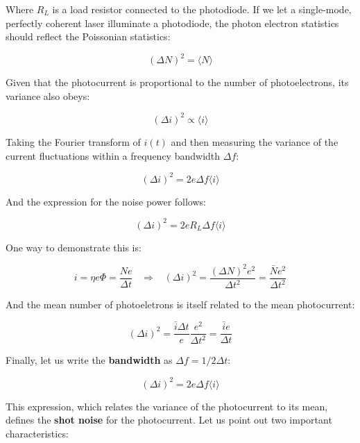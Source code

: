 \documentclass[12pt,a4paper]{report}
\begin{document}
Where $R_L$ is a load resistor connected to the photodiode. If we let a single-mode, perfectly coherent laser illuminate a photodiode, the photon electron statistics should reflect the Poissonian statistics:

\begin{equation}
    (\Delta N)^2=\langle N \rangle
\end{equation}

Given that the photocurrent is proportional to the number of photoelectrons, its variance also obeys:

\begin{equation}
    (\Delta i)^2 \propto \langle i \rangle
\end{equation}

Taking the Fourier transform of $i(t)$ and then measuring the variance of the current fluctuations within a frequency bandwidth $\Delta f$:

\begin{equation}
    (\Delta i)^2=2e\Delta f\langle i \rangle
\end{equation}

And the expression for the noise power follows:

\begin{equation}
    (\Delta i)^2=2eR_L\Delta f\langle i \rangle
\end{equation}

One way to demonstrate this is:

\begin{equation}
    i=\eta e \Phi=\frac{Ne}{\Delta t}  \;\;\;\Rightarrow\;\;\; (\Delta i)^2=\frac{(\Delta N)^2e^2}{\Delta t^2}= \frac{\bar{N}e^2}{\Delta t^2}
\end{equation}

And the mean number of photoeletrons is itself related to the mean photocurrent:

\begin{equation}
    (\Delta i)^2= \frac{\bar{i}\Delta t}{e}\frac{e^2}{\Delta t^2}=\frac{\bar{i}e}{\Delta t}
\end{equation}

Finally, let us write the \textbf{bandwidth} as $\Delta f=1/2\Delta t$:

\begin{equation}
    \boxed{(\Delta i)^2=2e\Delta f \langle i \rangle}
\end{equation}

This expression, which relates the variance of the photocurrent to its mean, defines the \textbf{shot noise} for the photocurrent. Let us point out two important characteristics:
\end{document}
